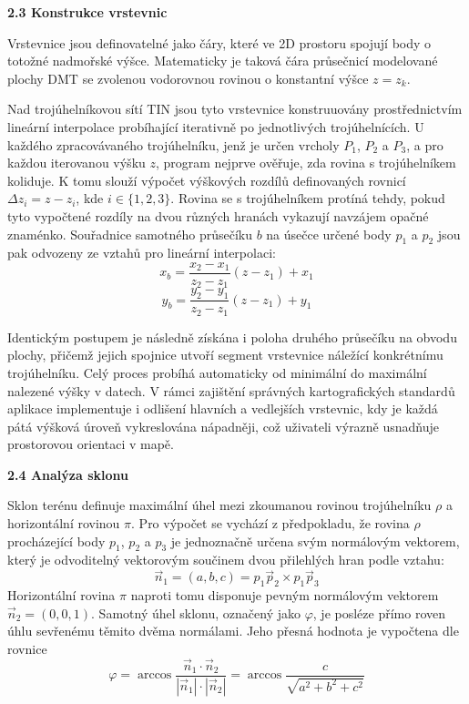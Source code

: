 \documentclass[12pt]{article}
\begin{document}
\textbf{2.3 Konstrukce vrstevnic}

Vrstevnice jsou definovatelné jako čáry, které ve 2D prostoru spojují body o totožné nadmořské výšce. Matematicky je taková čára průsečnicí modelované plochy DMT se zvolenou vodorovnou rovinou o konstantní výšce $z=z_{k}$.

Nad trojúhelníkovou sítí TIN jsou tyto vrstevnice konstruuovány prostřednictvím lineární interpolace probíhající iterativně po jednotlivých trojúhelnících. U každého zpracovávaného trojúhelníku, jenž je určen vrcholy $P_{1}$, $P_{2}$ a $P_{3}$, a pro každou iterovanou výšku $z$, program nejprve ověřuje, zda rovina s trojúhelníkem koliduje. K tomu slouží výpočet výškových rozdílů definovaných rovnicí $\Delta z_{i}=z-z_{i}$, kde $i\in\{1,2,3\}$. Rovina se s trojúhelníkem protíná tehdy, pokud tyto vypočtené rozdíly na dvou různých hranách vykazují navzájem opačné znaménko. Souřadnice samotného průsečíku $b$ na úsečce určené body $p_{1}$ a $p_{2}$ jsou pak odvozeny ze vztahů pro lineární interpolaci:   $$x_{b}=\frac{x_{2}-x_{1}}{z_{2}-z_{1}}(z-z_{1})+x_{1}$$$$y_{b}=\frac{y_{2}-y_{1}}{z_{2}-z_{1}}(z-z_{1})+y_{1}$$

Identickým postupem je následně získána i poloha druhého průsečíku na obvodu plochy, přičemž jejich spojnice utvoří segment vrstevnice náležící konkrétnímu trojúhelníku. Celý proces probíhá automaticky od minimální do maximální nalezené výšky v datech. V rámci zajištění správných kartografických standardů aplikace implementuje i odlišení hlavních a vedlejších vrstevnic, kdy je každá pátá výšková úroveň vykreslována nápadněji, což uživateli výrazně usnadňuje prostorovou orientaci v mapě.

\newpage
\textbf{2.4 Analýza sklonu}

Sklon terénu definuje maximální úhel mezi zkoumanou rovinou trojúhelníku $\rho$ a horizontální rovinou $\pi$. Pro výpočet se vychází z předpokladu, že rovina $\rho$ procházející body $p_{1}$, $p_{2}$ a $p_{3}$ je jednoznačně určena svým normálovým vektorem, který je odvoditelný vektorovým součinem dvou přilehlých hran podle vztahu:   $$\vec{n}_{1}=(a,b,c)=p_{1}\vec{p}_{2}\times p_{1}\vec{p}_{3}$$ 
Horizontální rovina $\pi$ naproti tomu disponuje pevným normálovým vektorem $\vec{n}_{2}=(0,0,1)$. Samotný úhel sklonu, označený jako $\varphi$, je posléze přímo roven úhlu sevřenému těmito dvěma normálami. Jeho přesná hodnota je vypočtena dle rovnice   $$\varphi=\arccos\frac{\vec{n}_{1}\cdot\vec{n}_{2}}{|\vec{n}_{1}|\cdot|\vec{n}_{2}|}=\arccos\frac{c}{\sqrt{a^{2}+b^{2}+c^{2}}}$$ 
\end{document}
